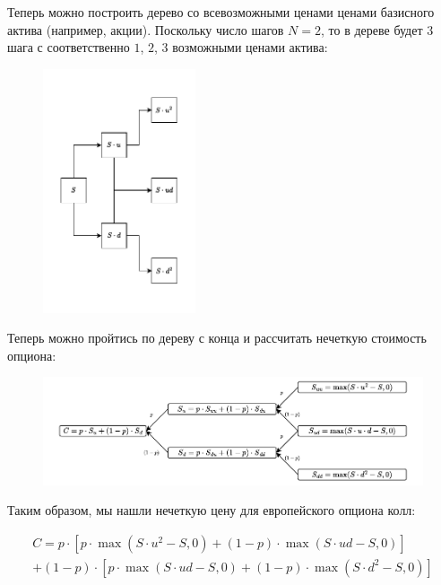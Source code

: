 \documentclass[a4paper,12pt]{extarticle} %
\begin{document}
	Теперь можно построить дерево со всевозможными ценами ценами базисного актива (например, акции). Поскольку число шагов $N=2$, то в дереве будет $3$ шага с соответственно $1$, $2$, $3$ возможными ценами актива:
	
	\begin{figure}[H]
		\centering
		\includegraphics[width=0.4\textwidth]{_images/Биномиальная модель на нечетких числах_1.drawio.pdf}
	\end{figure}
	
	Теперь можно пройтись по дереву с конца и рассчитать нечеткую стоимость опциона: 
	
	\begin{figure}[H]
		\centering
		\includegraphics[width=\textwidth]{_images/Биномиальная модель на нечетких числах_2.drawio.pdf}
	\end{figure}
	
	Таким образом, мы нашли нечеткую цену для европейского опциона колл: 
	
	\begin{equation}
		\begin{split}
			C=p\cdot[p \cdot \max(S \cdot u^2 - S, 0) + (1-p) \cdot \max(S \cdot ud - S, 0)]
			\\
			+(1-p)\cdot[p \cdot \max(S \cdot ud - S, 0) + (1-p)\cdot \max(S\cdot d^2-S, 0)]
		\end{split}
	\end{equation}
	
\end{document}
